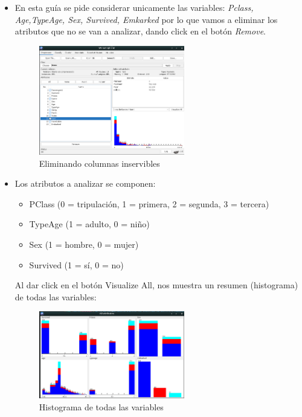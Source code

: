 \documentclass[12pt]{article}
\begin{document}
\begin{itemize}
                    \item En esta guía se pide considerar unicamente las variables: \textit{Pclass, Age,TypeAge, Sex, Survived, Emkarked} por lo que vamos a eliminar los atributos que no se van a analizar, dando click en el botón \textit{Remove}.
                        \begin{figure}[!h]
                            \centering
                            \includegraphics[width=0.6\textwidth]{img/weka-4.png}
                            \caption{Eliminando columnas inservibles}
                        \end{figure}
                    
                    \item Los atributos a analizar se componen:
                        \begin{itemize}
                            \item PClass (0 = tripulación, 1 = primera, 2 = segunda, 3 = tercera)
                            \item TypeAge (1 = adulto, 0 = niño)
                            \item Sex (1 = hombre, 0 = mujer)
                            \item Survived (1 = sí, 0 = no)
                        \end{itemize}
                        Al dar click en el botón Visualize All, nos muestra un resumen (histograma) de todas las variables:
                        \begin{figure}[!h]
                            \centering
                            \includegraphics[width=0.6\textwidth]{img/weka-5.png}
                            \caption{Histograma de todas las variables}
                        \end{figure}


\end{itemize}
\end{document}
